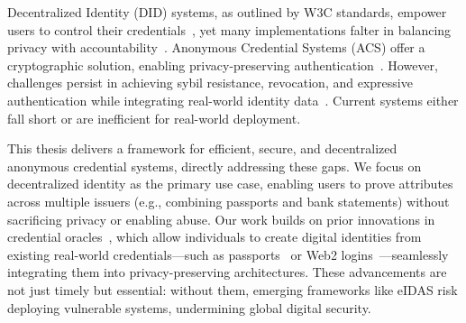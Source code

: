 Decentralized Identity (DID) systems, as outlined by W3C standards, empower users to control their credentials~\cite{soltani_survey_2021}, yet many implementations falter in balancing privacy with accountability~\cite{maram_candid_2020}. Anonymous Credential Systems (ACS) offer a cryptographic solution, enabling privacy-preserving authentication~\cite{chaum_untraceable_1981, hutchison_signature_2004, dunkelman_formal_2016, security_team_computer_science_dept_ibm_zurich_cryptographic_2010}. However, challenges persist in achieving sybil resistance, revocation, and expressive authentication while integrating real-world identity data~\cite{crites_syra_2024, rosenberg_zk-creds_2022}. Current systems either fall short or are inefficient for real-world deployment. 

This thesis delivers a framework for efficient, secure, and decentralized anonymous credential systems, directly addressing these gaps. We focus on decentralized identity as the primary use case, enabling users to prove attributes across multiple issuers (e.g., combining passports and bank statements) without sacrificing privacy or enabling abuse. Our work builds on prior innovations in credential oracles~\cite{zhang_deco_2020}, which allow individuals to create digital identities from existing real-world credentials—such as passports~\cite{rosenberg_zk-creds_2022} or Web2 logins~\cite{baldimtsi_zklogin_2024}—seamlessly integrating them into privacy-preserving architectures. These advancements are not just timely but essential: without them, emerging frameworks like eIDAS risk deploying vulnerable systems, undermining global digital security.

